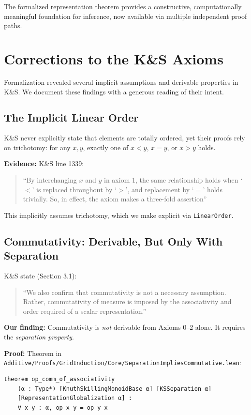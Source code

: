 \documentclass[11pt]{article}
\theoremstyle{definition}
\theoremstyle{remark}
\begin{document}
The formalized representation theorem provides a constructive, computationally meaningful foundation for inference, now available via multiple independent proof paths.

\appendix

\section{Corrections to the K\&S Axioms}
\label{app:corrections}

Formalization revealed several implicit assumptions and derivable properties in K\&S.
We document these findings with a generous reading of their intent.

\subsection{The Implicit Linear Order}

K\&S never explicitly state that elements are totally ordered, yet their proofs rely on trichotomy: for any $x, y$, exactly one of $x < y$, $x = y$, or $x > y$ holds.

\textbf{Evidence:} K\&S line 1339:
\begin{quote}
``By interchanging $x$ and $y$ in axiom 1, the same relationship holds when `$<$' is replaced throughout by `$>$', and replacement by `$=$' holds trivially. So, in effect, the axiom makes a three-fold assertion''
\end{quote}

This implicitly assumes trichotomy, which we make explicit via \texttt{LinearOrder}.

\subsection{Commutativity: Derivable, But Only With Separation}

K\&S state (Section 3.1):
\begin{quote}
``We also confirm that commutativity is not a necessary assumption. Rather, commutativity of measure is imposed by the associativity and order required of a scalar representation.''
\end{quote}

\textbf{Our finding:} Commutativity is \emph{not} derivable from Axioms 0--2 alone.
It requires the \emph{separation property}.

\textbf{Proof:} Theorem in \texttt{Additive/Proofs/GridInduction/Core/SeparationImpliesCommutative.lean}:
\begin{lstlisting}
theorem op_comm_of_associativity
    (α : Type*) [KnuthSkillingMonoidBase α] [KSSeparation α]
    [RepresentationGlobalization α] :
    ∀ x y : α, op x y = op y x
\end{lstlisting}
\end{document}
